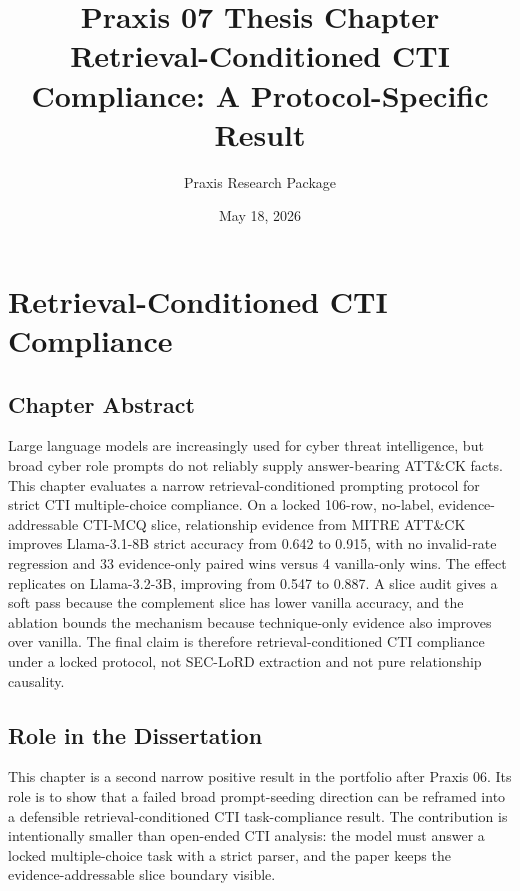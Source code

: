 \documentclass[12pt]{report}
\title{Praxis 07 Thesis Chapter\\Retrieval-Conditioned CTI Compliance: A Protocol-Specific Result}
\author{Praxis Research Package}
\date{May 18, 2026}
\begin{document}
\maketitle

\chapter{Retrieval-Conditioned CTI Compliance}

\section*{Chapter Abstract}

Large language models are increasingly used for cyber threat intelligence, but broad cyber role prompts do not reliably supply answer-bearing ATT\&CK facts.
This chapter evaluates a narrow retrieval-conditioned prompting protocol for strict CTI multiple-choice compliance.
On a locked 106-row, no-label, evidence-addressable CTI-MCQ slice, relationship evidence from MITRE ATT\&CK improves Llama-3.1-8B strict accuracy from 0.642 to 0.915, with no invalid-rate regression and 33 evidence-only paired wins versus 4 vanilla-only wins.
The effect replicates on Llama-3.2-3B, improving from 0.547 to 0.887.
A slice audit gives a soft pass because the complement slice has lower vanilla accuracy, and the ablation bounds the mechanism because technique-only evidence also improves over vanilla.
The final claim is therefore retrieval-conditioned CTI compliance under a locked protocol, not SEC-LoRD extraction and not pure relationship causality.

\section*{Role in the Dissertation}

This chapter is a second narrow positive result in the portfolio after Praxis 06.
Its role is to show that a failed broad prompt-seeding direction can be reframed into a defensible retrieval-conditioned CTI task-compliance result.
The contribution is intentionally smaller than open-ended CTI analysis: the model must answer a locked multiple-choice task with a strict parser, and the paper keeps the evidence-addressable slice boundary visible.

\def\praxiswrapper{1}




\end{document}
